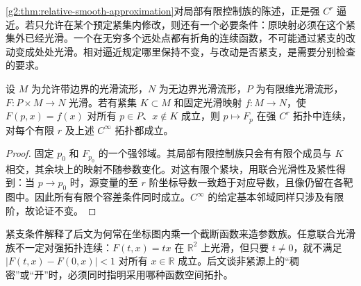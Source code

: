 \cref{g2:thm:relative-smooth-approximation}对局部有限控制族的陈述，正是强 \(C^r\) 逼近。若只允许在某个预定紧集内修改，则还有一个必要条件：原映射必须在这个紧集外已经光滑。一个在无穷多个远处点都有折角的连续函数，不可能通过紧支的改动变成处处光滑。相对逼近规定哪里保持不变，与改动是否紧支，是需要分别检查的要求。

\begin{proposition}
	\label{g2:prop:compact-support-family-continuity}
	设 \(M\) 为允许带边界的光滑流形，\(N\) 为无边界光滑流形，\(P\) 为有限维光滑流形，\(F:P\times M\to N\) 光滑。若有紧集 \(K\subset M\) 和固定光滑映射 \(f:M\to N\)，使 \(F(p,x)=f(x)\) 对所有 \(p\in P\)、\(x\notin K\) 成立，则 \(p\mapsto F_p\) 在强 \(C^r\) 拓扑中连续，对每个有限 \(r\) 及上述 \(C^\infty\) 拓扑都成立。
\end{proposition}
\begin{proof}
	固定 \(p_0\) 和 \(F_{p_0}\) 的一个强邻域。其局部有限控制族只会有有限个成员与 \(K\) 相交，其余块上的映射不随参数变化。对这有限个紧块，用联合光滑性及紧性得到：当 \(p\to p_0\) 时，源变量的至 \(r\) 阶坐标导数一致趋于对应导数，且像仍留在各靶图中。因此所有有限个容差条件同时成立。\(C^\infty\) 的给定基本邻域同样只涉及有限阶，故论证不变。
\end{proof}

紧支条件解释了后文为何常在坐标图内乘一个截断函数来造参数族。任意联合光滑族不一定对强拓扑连续：\(F(t,x)=tx\) 在 \(\mathbb R^2\) 上光滑，但只要 \(t\ne0\)，就不满足 \(|F(t,x)-F(0,x)|<1\) 对所有 \(x\in\mathbb R\) 成立。后文谈非紧源上的“稠密”或“开”时，必须同时指明采用哪种函数空间拓扑。
